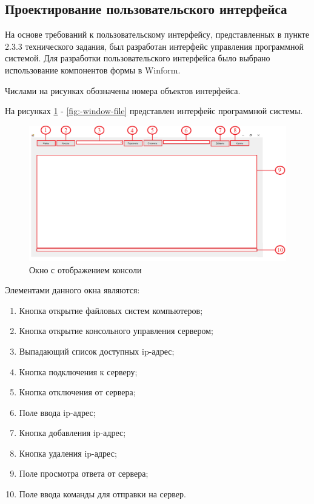 \subsection{Проектирование пользовательского интерфейса}

На основе требований к пользовательскому интерфейсу, представленных в пункте 2.3.3 технического задания, был разработан интерфейс управления программной системой. Для разработки пользовательского интерфейса было выбрано использование компонентов формы в Winform.
 
Числами на рисунках обозначены номера объектов интерфейса.

На рисунках \ref{fig:-window-console} - \ref{fig:-window-file} представлен интерфейс программной системы.

\begin{figure}
	\centering
	\includegraphics[width=1\linewidth]{"images/Окно с консолью"}
	\caption{Окно с отображением консоли}
	\label{fig:-window-console}
\end{figure}

Элементами данного окна являются:
\begin{enumerate}
	\item Кнопка открытие файловых систем компьютеров;
	\item Кнопка открытие консольного управления сервером;
	\item Выпадающий список доступных ip-адрес;
	\item Кнопка подключения к серверу;
	\item Кнопка отключения от сервера;
	\item Поле ввода ip-адрес;
	\item Кнопка добавления ip-адрес;
	\item Кнопка удаления ip-адрес;
	\item Поле просмотра ответа от сервера;
	\item Поле ввода команды для отправки на сервер.
\end{enumerate}

